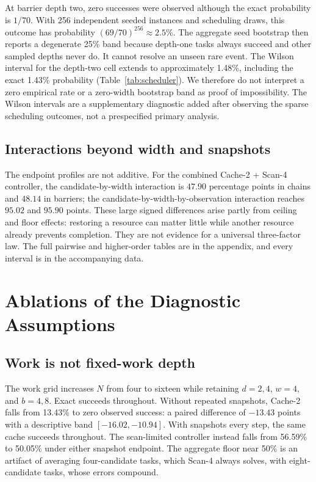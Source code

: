 \documentclass[sigconf,nonacm]{acmart}
\begin{document}
\begin{table}[t]
\centering
\small
\resizebox{\columnwidth}{!}{}
\caption{Random-scheduler calibration using one representative cell per
depth and family, with 256 distinct seeds. Other candidate, width, and
observation conditions repeat the same scheduling draws and do not
increase this effective trial count. Wilson 95\% binomial intervals
retain uncertainty at zero observed successes.}
\label{tab:scheduler}
\end{table}

At barrier depth two, zero successes were observed although the exact
probability is $1/70$. With 256 independent seeded instances and scheduling
draws, this outcome has probability $(69/70)^{256}\approx2.5\%$.
The aggregate seed bootstrap then reports a degenerate 25\% band because
depth-one tasks always succeed and other sampled depths never do.
It cannot resolve an unseen rare event. The Wilson interval for the
depth-two cell extends to approximately 1.48\%, including the exact
1.43\% probability (Table~\ref{tab:scheduler}).
We therefore do not interpret a zero empirical rate or a zero-width
bootstrap band as proof of impossibility.
The Wilson intervals are a supplementary diagnostic added after observing
the sparse scheduling outcomes, not a prespecified primary analysis.

\subsection{Interactions beyond width and snapshots}
The endpoint profiles are not additive. For the combined Cache-2 + Scan-4
controller, the candidate-by-width interaction is $47.90$ percentage
points in chains and $48.14$ in barriers; the candidate-by-width-by-observation
interaction reaches $95.02$ and $95.90$ points. These large signed
differences arise partly from ceiling and floor effects: restoring a
resource can matter little while another resource already prevents
completion. They are not evidence for a universal three-factor law.
The full pairwise and higher-order tables are in the appendix, and every
interval is in the accompanying data.

\section{Ablations of the Diagnostic Assumptions}
\subsection{Work is not fixed-work depth}
The work grid increases $N$ from four to sixteen while retaining $d=2,4$,
$w=4$, and $b=4,8$. Exact succeeds throughout. Without repeated snapshots,
Cache-2 falls from 13.43\% to zero observed success: a paired difference
of $-13.43$ points with a descriptive band $[-16.02,-10.94]$.
With snapshots every step, the same cache succeeds throughout.
The scan-limited controller instead falls from 56.59\% to 50.05\%
under either snapshot endpoint. The aggregate floor near 50\% is an
artifact of averaging four-candidate tasks, which Scan-4 always solves,
with eight-candidate tasks, whose errors compound.
\end{document}
